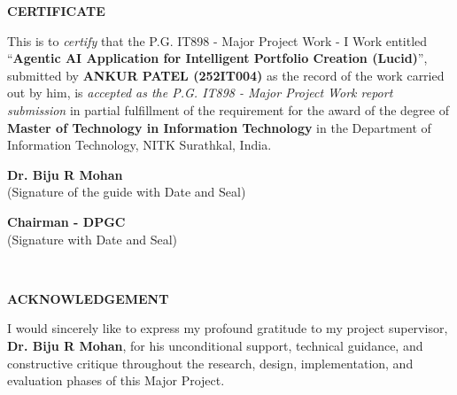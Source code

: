 \documentclass[12pt, a4paper, openright, twoside]{report}
\begin{document}
\begin{framed}
\begin{center}
\textbf{{\Large CERTIFICATE}} \\
\end{center}
\null
This is to \textit{certify} that the P.G. IT898 - Major Project Work - I Work entitled ``\textbf{Agentic AI Application for Intelligent Portfolio Creation (Lucid)}'', submitted by \textbf{ANKUR PATEL (252IT004)} as the record of the work carried out by him, is \textit{accepted as the P.G. IT898 - Major Project Work report submission} in partial fulfillment of the requirement for the award of the degree of \textbf{Master of Technology in Information Technology} in the Department of Information Technology, NITK Surathkal, India.

\vspace{3cm}

\begin{center}
\textbf{Dr. Biju R Mohan}\\
(Signature of the guide with Date and Seal)
\end{center}

\vspace{2cm}

\begin{center}
\textbf{Chairman - DPGC}\\
(Signature with Date and Seal)
\end{center}

\end{framed}

\thispagestyle{empty}

\clearpage
\newpage

\ %

\newpage
\thispagestyle{empty}

\begin{center}
\textbf{{\Large ACKNOWLEDGEMENT}}\\
\end{center}
\null
I would sincerely like to express my profound gratitude to my project supervisor, \textbf{Dr. Biju R Mohan}, for his unconditional support, technical guidance, and constructive critique throughout the research, design, implementation, and evaluation phases of this Major Project.
\end{document}
